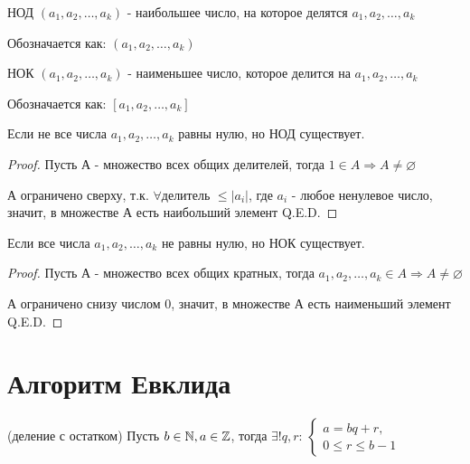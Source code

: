 \begin{definition}
    НОД $(a_1, a_2, \ldots, a_k)$ - наибольшее число, на которое делятся $a_1, a_2, \ldots, a_k$

    Обозначается как: $(a_1, a_2, \ldots, a_k)$
\end{definition}

\begin{definition}
    НОК $(a_1, a_2, \ldots, a_k)$ - наименьшее число, которое делится на $a_1, a_2, \ldots, a_k$

    Обозначается как: $[a_1, a_2, \ldots, a_k]$
\end{definition}

\begin{theorem}
    Если не все числа $a_1, a_2, \ldots, a_k$ равны нулю, но НОД существует.
\end{theorem}

\begin{proof}
    Пусть А - множество всех общих делителей, тогда $1 \in A \Rightarrow A \neq \varnothing$

    А ограничено сверху, т.к. $\forall \text{делитель } \leq |a_i|$, где $a_i$ - любое ненулевое число, значит, в множестве А есть наибольший элемент Q.E.D.
\end{proof}

\begin{theorem}
    Если все числа $a_1, a_2, \ldots, a_k$ не равны нулю, но НОК существует.
\end{theorem}



\begin{proof}
    Пусть А - множество всех общих кратных, тогда $a_1, a_2, \ldots, a_k \in A \Rightarrow A \neq \varnothing$

    А ограничено снизу числом 0, значит, в множестве А есть наименьший элемент Q.E.D.
\end{proof}

\section{Алгоритм Евклида}

\begin{theorem} (деление с остатком)
    Пусть $b \in \mathbb{N}, a \in \mathbb{Z}$, тогда $\exists! q, r$: 
    $\begin{cases} 
        a= bq + r,\\ 
        0 \leq r \leq b - 1
    \end{cases}$
\end{theorem}

